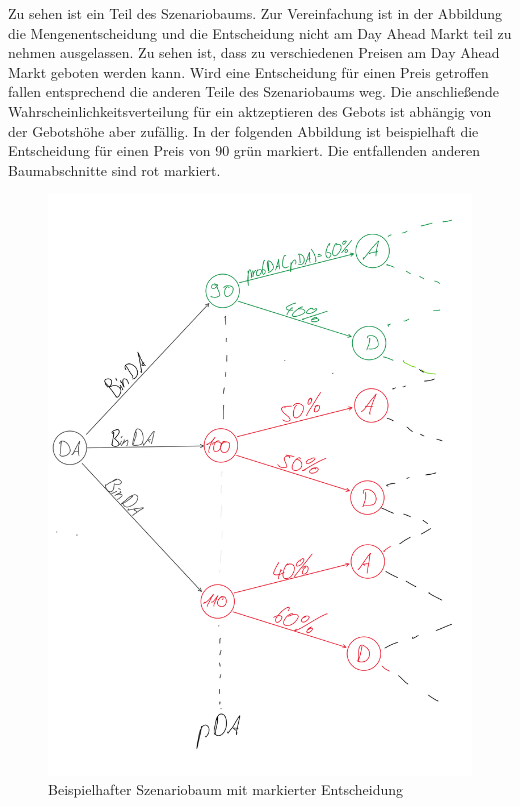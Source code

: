\documentclass{article}
\begin{document}
Zu sehen ist ein Teil des Szenariobaums. Zur Vereinfachung ist in der Abbildung die Mengenentscheidung und die Entscheidung nicht am Day Ahead Markt teil zu nehmen ausgelassen. Zu sehen ist, dass zu verschiedenen Preisen am Day Ahead Markt geboten werden kann. 
Wird eine Entscheidung für einen Preis getroffen fallen entsprechend die anderen Teile des Szenariobaums weg.
Die anschließende Wahrscheinlichkeitsverteilung für ein aktzeptieren des Gebots ist abhängig von der Gebotshöhe aber zufällig.
In der folgenden Abbildung ist beispielhaft die Entscheidung für einen Preis von 90 grün markiert. Die entfallenden anderen Baumabschnitte sind rot markiert.\\

\begin{figure}[H]

    \includegraphics[width=1\linewidth]{pictures/szBaumBeispiel_markiert.png}
    \caption{Beispielhafter Szenariobaum mit markierter Entscheidung}
    \label{fig:enter-label}
\end{figure}
\end{document}
